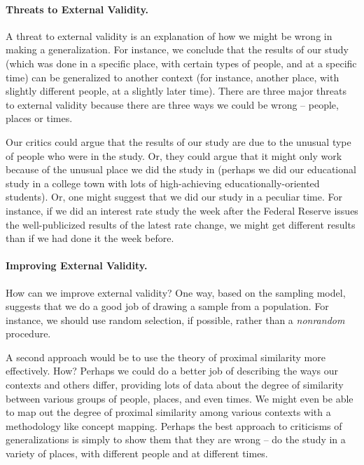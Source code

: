 \paragraph{Threats to External Validity.}
A threat to external validity is an explanation of how we might be wrong in making a generalization. For instance, we conclude that the results of our study (which was done in a specific place, with certain types of people, and at a specific time) can be generalized to another context (for instance, another place, with slightly different people, at a slightly later time). There are three major threats to external validity because there are three ways we could be wrong -- people, places or times.

Our critics could argue that the results of our study are due to the unusual type of people who were in the study. Or, they could argue that it might only work because of the unusual place we did the study in (perhaps we did our educational study in a college town with lots of high-achieving educationally-oriented students). Or, one might suggest that we did our study in a peculiar time. For instance, if we did an interest rate study the week after the Federal Reserve issues the well-publicized results of the latest rate change, we might get different results than if we had done it the week before.

\paragraph{Improving External Validity.}
How can we improve external validity? One way, based on the sampling model, suggests that we do a good job of drawing a sample from a population. For instance, we should use random selection, if possible, rather than a \emph{nonrandom} procedure.
\marginpar{\begin{small}\begin{flushleft}\textcolor{blue}{External validity (ability to generalize) will be stronger the more we replicate our study.}\end{flushleft}\end{small}}

A second approach would be to use the theory of proximal similarity more effectively. How? Perhaps we could do a better job of describing the ways our contexts and others differ, providing lots of data about the degree of similarity between various groups of people, places, and even times. We might even be able to map out the degree of proximal similarity among various contexts with a methodology like concept mapping. Perhaps the best approach to criticisms of generalizations is simply to show them that they are wrong -- do the study in a variety of places, with different people and at different times.

